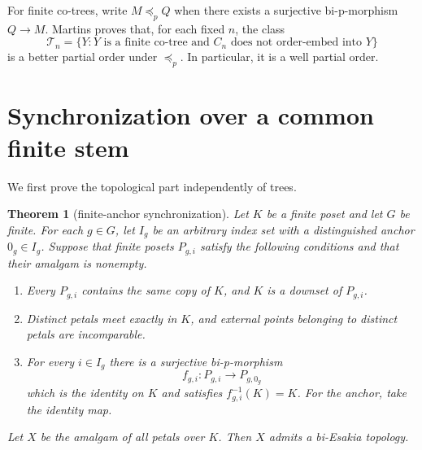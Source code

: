 \documentclass[11pt]{article}
\newtheorem{theorem}{Theorem}[section]
\theoremstyle{remark}
\numberwithin{equation}{section}
\begin{document}
For finite co-trees, write $M\preceq_p Q$ when there exists a surjective
bi-p-morphism $Q\to M$. Martins \cite{ref5} proves that, for each fixed $n$,
the class
\begin{equation}
\mathcal T_n=
\{Y:Y\text{ is a finite co-tree and }C_n
  \text{ does not order-embed into }Y\}
\label{eq:Tn}
\end{equation}
is a better partial order under $\preceq_p$. In particular, it is a well
partial order.

\section{Synchronization over a common finite stem}

We first prove the topological part independently of trees.

\begin{theorem}[finite-anchor synchronization]\label{thm:synchronization}
Let $K$ be a finite poset and let $G$ be finite. For each $g\in G$, let $I_g$
be an arbitrary index set with a distinguished anchor $0_g\in I_g$. Suppose
that finite posets $P_{g,i}$ satisfy the following conditions and that their
amalgam is nonempty.
\begin{enumerate}
\item Every $P_{g,i}$ contains the same copy of $K$, and $K$ is a downset of
  $P_{g,i}$.
\item Distinct petals meet exactly in $K$, and external points belonging to
  distinct petals are incomparable.
\item For every $i\in I_g$ there is a surjective bi-p-morphism
  \[
  f_{g,i}:P_{g,i}\longrightarrow P_{g,0_g}
  \]
  which is the identity on $K$ and satisfies $f_{g,i}^{-1}(K)=K$. For the
  anchor, take the identity map.
\end{enumerate}
Let $X$ be the amalgam of all petals over $K$. Then $X$ admits a bi-Esakia
topology.
\end{theorem}
\end{document}
